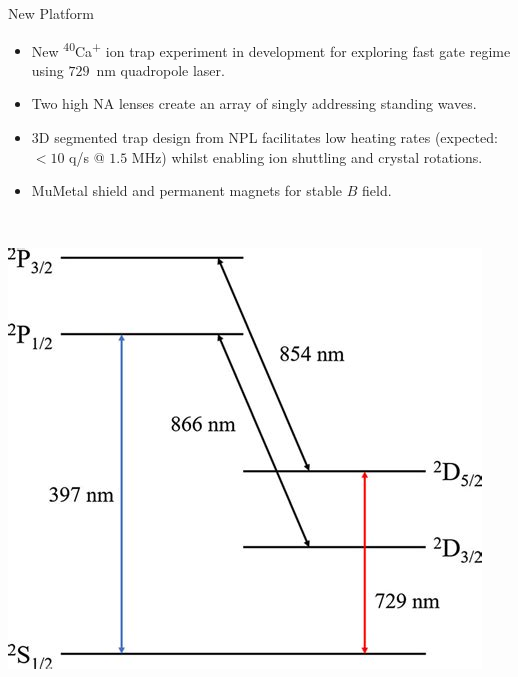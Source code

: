 \documentclass[final]{beamer}
\begin{document}
\begin{frame}{}
\begin{center}
\begin{columns}[t]
\begin{column}{0.49\textwidth}
    \begin{alertblock}{New Platform}
      \begin{minipage}{0.58\textwidth}
      \begin{itemize}
      \item New \textsuperscript{40}Ca\textsuperscript{+} ion trap experiment in development for exploring fast
        gate regime using $729$~nm quadropole laser.
      \item Two high NA lenses create an array of singly
        addressing standing waves.
      \item 3D segmented trap design from NPL facilitates low heating
        rates (expected: $<10$ q/s @ $1.5$ MHz) whilst enabling ion shuttling and crystal rotations.
      \item MuMetal shield and permanent magnets for stable $B$ field.
      \end{itemize}
      \end{minipage}
      ~~
      \begin{minipage}{0.35\textwidth}
      \includegraphics[width=0.94\textwidth]{./figs/ca_struct_tmp.jpeg}
      \end{minipage}


\end{alertblock}
\end{column}
\end{columns}
\end{center}
\end{frame}
\end{document}
